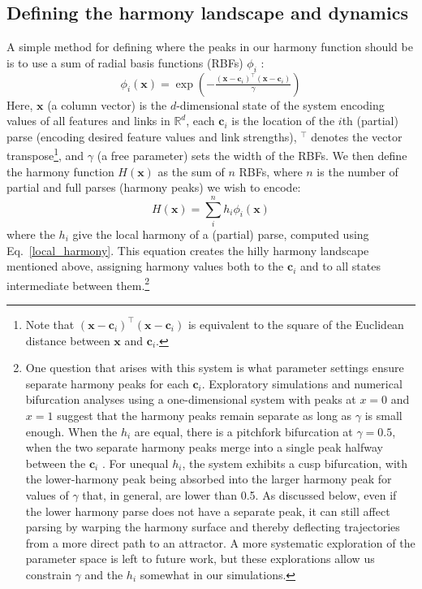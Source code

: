 \documentclass[10pt,letterpaper]{article}
\begin{document}
\subsection{Defining the harmony landscape and dynamics}
A simple method for defining where the peaks in our harmony function should be is to use a sum of radial basis functions (RBFs) $\phi_i$ \cite{han1989convergence, ciocoiu1996analog, ciocoiu2009invariant, muezzinoglu2006rbf}:
$$
\phi_i(\mathbf{x}) = \exp\left(-\tfrac{(\mathbf{x} - \mathbf{c}_i)^\intercal(\mathbf{x} - \mathbf{c}_i)}{\gamma}\right)
$$
Here, $\mathbf{x}$ (a column vector) is the $d$-dimensional state of the system encoding values of all features and links in $\mathbb{R}^d$, each $\mathbf{c}_i$ is the location of the $i$th (partial) parse (encoding desired feature values and link strengths), $^\intercal$ denotes the vector transpose\footnote{Note that $(\mathbf{x} - \mathbf{c}_i)^\intercal(\mathbf{x} - \mathbf{c}_i)$ is equivalent to the square of the Euclidean distance between $\mathbf{x}$ and $\mathbf{c}_i$.}, and $\gamma$ (a free parameter) sets the width of the RBFs. We then define the harmony function $H(\mathbf{x})$ as the sum of $n$ RBFs, where $n$ is the number of partial and full parses (harmony peaks) we wish to encode:
\begin{equation}\label{harmony}
H(\mathbf{x}) = \sum_{i}^{n} h_i \phi_i(\mathbf{x})
\end{equation}
where the $h_i$ give the local harmony of a (partial) parse, computed using Eq.~\ref{local_harmony}. This equation creates the hilly harmony landscape mentioned above, assigning harmony values both to the $\mathbf{c}_i$ and to all states intermediate between them.\footnote{One question that arises with this system is what parameter settings ensure separate harmony peaks for each $\mathbf{c}_i$. Exploratory simulations and numerical bifurcation analyses \cite{meijer2009numerical} using a one-dimensional system with peaks at $x = 0$ and $x = 1$ suggest that the harmony peaks remain separate as long as $\gamma$ is small enough. When the $h_i$ are equal, there is a pitchfork bifurcation at $\gamma = 0.5$, when the two separate harmony peaks merge into a single peak halfway between the $\mathbf{c}_i$ \cite[report a similar finding]{muezzinoglu2006rbf}. For unequal $h_i$, the system exhibits a cusp bifurcation, with the lower-harmony peak being absorbed into the larger harmony peak for values of $\gamma$ that, in general, are lower than 0.5. As discussed below, even if the lower harmony parse does not have a separate peak, it can still affect parsing by warping the harmony surface and thereby deflecting trajectories from a more direct path to an attractor. A more systematic exploration of the parameter space is left to future work, but these explorations allow us constrain $\gamma$ and the $h_i$ somewhat in our simulations.}\label{bif}
\end{document}
